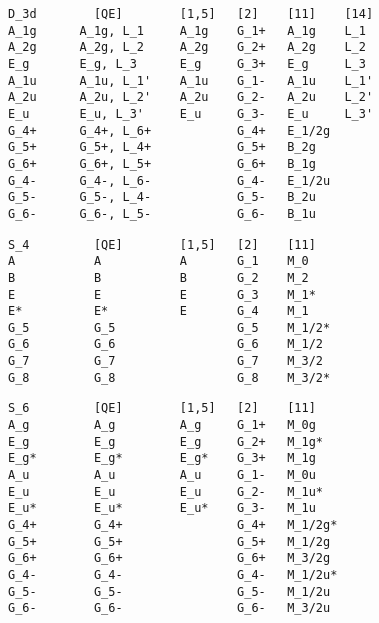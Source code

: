 \documentclass[12pt,a4paper,twoside]{report}
\begin{document}
\begin{tcolorbox}
\begin{footnotesize}
\begin{verbatim}
D_3d        [QE]        [1,5]   [2]    [11]    [14]
A_1g      A_1g, L_1     A_1g    G_1+   A_1g    L_1
A_2g      A_2g, L_2     A_2g    G_2+   A_2g    L_2
E_g       E_g, L_3      E_g     G_3+   E_g     L_3
A_1u      A_1u, L_1'    A_1u    G_1-   A_1u    L_1'   
A_2u      A_2u, L_2'    A_2u    G_2-   A_2u    L_2'
E_u       E_u, L_3'     E_u     G_3-   E_u     L_3'
G_4+      G_4+, L_6+            G_4+   E_1/2g
G_5+      G_5+, L_4+            G_5+   B_2g
G_6+      G_6+, L_5+            G_6+   B_1g
G_4-      G_4-, L_6-            G_4-   E_1/2u
G_5-      G_5-, L_4-            G_5-   B_2u
G_6-      G_6-, L_5-            G_6-   B_1u
\end{verbatim}
\end{footnotesize}
\end{tcolorbox}


\begin{tcolorbox}
\begin{footnotesize}
\begin{verbatim}
S_4         [QE]        [1,5]   [2]    [11]
A           A           A       G_1    M_0
B           B           B       G_2    M_2
E           E           E       G_3    M_1*
E*          E*          E       G_4    M_1
G_5         G_5                 G_5    M_1/2*
G_6         G_6                 G_6    M_1/2
G_7         G_7                 G_7    M_3/2
G_8         G_8                 G_8    M_3/2*
\end{verbatim}
\end{footnotesize}
\end{tcolorbox}


\begin{tcolorbox}
\begin{footnotesize}
\begin{verbatim}
S_6         [QE]        [1,5]   [2]    [11]
A_g         A_g         A_g     G_1+   M_0g
E_g         E_g         E_g     G_2+   M_1g*
E_g*        E_g*        E_g*    G_3+   M_1g
A_u         A_u         A_u     G_1-   M_0u
E_u         E_u         E_u     G_2-   M_1u*
E_u*        E_u*        E_u*    G_3-   M_1u
G_4+        G_4+                G_4+   M_1/2g*
G_5+        G_5+                G_5+   M_1/2g
G_6+        G_6+                G_6+   M_3/2g
G_4-        G_4-                G_4-   M_1/2u*
G_5-        G_5-                G_5-   M_1/2u
G_6-        G_6-                G_6-   M_3/2u
\end{verbatim}
\end{footnotesize}
\end{tcolorbox}
\end{document}
